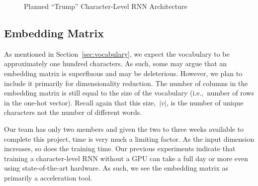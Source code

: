 \documentclass{report}
\begin{document}
\begin{figure}
    \vspace{0.3em} 
    \caption{Planned ``Trump'' Character-Level RNN Architecture}\label{fig:trumpLearnerArchitecture}
  \end{figure}

  \subsection{Embedding Matrix}

  As mentioned in Section~\ref{sec:vocabulary}, we expect the vocabulary to be approximately one hundred characters.  As such, some may argue that an embedding matrix is superfluous and may be deleterious.  However, we plan to include it primarily for dimensionality reduction.  The number of columns in the embedding matrix is still equal to the size of the vocabulary (i.e.,~number of rows in the one-hot vector).  Recall again that this size,~$|v|$, is the number of unique characters not the number of different words.
  
  Our team has only two members and given the two to three weeks available to complete this project, time is very much a limiting factor.  As the input dimension increases, so does the training time.  Our previous experiments indicate that training a character-level RNN without a GPU can take a full day or more even using state-of-the-art hardware.  As such, we see the embedding matrix as primarily a acceleration tool.
  
\end{document}
